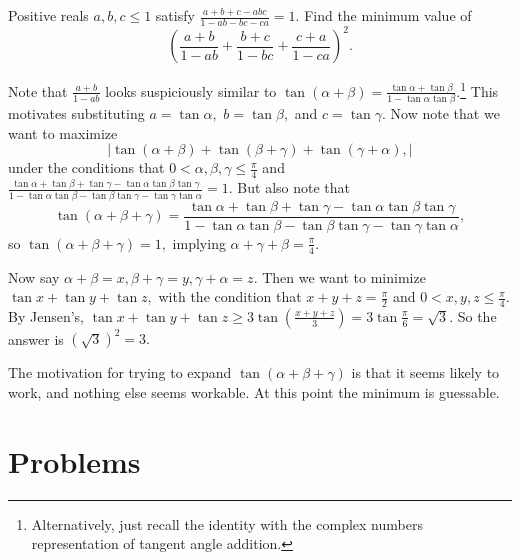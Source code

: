 \documentclass[blue,onecol]{shooting}
\begin{document}
\begin{exam}[CNCM R1/5]
Positive reals $a,b,c\leq 1$ satisfy $\frac{a+b+c-abc}{1-ab-bc-ca}=1.$ Find the minimum value of
\[(\frac{a+b}{1-ab}+\frac{b+c}{1-bc}+\frac{c+a}{1-ca})^2.\]
\end{exam}

\begin{sol}
Note that $\frac{a+b}{1-ab}$ looks suspiciously similar to $\tan(\alpha+\beta)=\frac{\tan\alpha+\tan\beta}{1-\tan\alpha\tan\beta}.$\footnote{Alternatively, just recall the identity with the complex numbers representation of tangent angle addition.} This motivates substituting $a=\tan\alpha,$ $b=\tan\beta,$ and $c=\tan\gamma.$ Now note that we want to maximize
\[|\tan(\alpha+\beta)+\tan(\beta+\gamma)+\tan(\gamma+\alpha),|\]
under the conditions that $0<\alpha,\beta,\gamma\leq\frac{\pi}{4}$ and $\frac{\tan\alpha+\tan\beta+\tan\gamma-\tan\alpha\tan\beta\tan\gamma}{1-\tan\alpha\tan\beta-\tan\beta\tan\gamma-\tan\gamma\tan\alpha}=1.$ But also note that
\[\tan(\alpha+\beta+\gamma)=\frac{\tan\alpha+\tan\beta+\tan\gamma-\tan\alpha\tan\beta\tan\gamma}{1-\tan\alpha\tan\beta-\tan\beta\tan\gamma-\tan\gamma\tan\alpha},\] so $\tan(\alpha+\beta+\gamma)=1,$ implying $\alpha+\gamma+\beta=\frac{\pi}{4}.$

Now say $\alpha+\beta=x,\beta+\gamma=y,\gamma+\alpha=z.$ Then we want to minimize $\tan x+\tan y+\tan z,$ with the condition that $x+y+z=\frac{\pi}{2}$ and $0<x,y,z\leq \frac{\pi}{4}.$ By Jensen's, $\tan x+\tan y+\tan z\geq 3\tan\left(\frac{x+y+z}{3}\right)=3\tan\frac{\pi}{6}=\sqrt{3}.$ So the answer is $(\sqrt{3})^2=3.$ 
\end{sol}
The motivation for trying to expand $\tan(\alpha+\beta+\gamma)$ is that it seems likely to work, and nothing else seems workable. At this point the minimum is guessable.

\pagebreak

\section{Problems}




 
\end{document}
